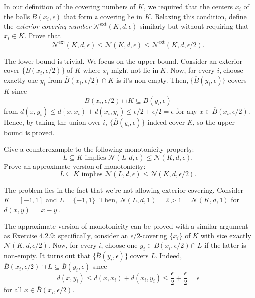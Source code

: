 \begin{problem*}[Exercise 4.2.9]\label{ex4.2.9}
	In our definition of the covering numbers of \(K\), we required that the centers \(x_i\) of the balls \(B(x_i, \epsilon )\) that form a covering lie in \(K\). Relaxing this condition, define the \emph{exterior covering number} \(\mathcal{N}^{\mathrm{ext} } (K, d, \epsilon )\) similarly but without requiring that \(x_i \in K\). Prove that
	\[
		\mathcal{N} ^{\mathrm{ext} }(K, d, \epsilon )
		\leq \mathcal{N} (K, d, \epsilon )
		\leq \mathcal{N} ^{\mathrm{ext} }(K, d, \epsilon / 2).
	\]
\end{problem*}
\begin{answer}
	The lower bound is trivial. We focus on the upper bound. Consider an exterior cover \(\{ \overline{B} (x_i, \epsilon / 2) \} \) of \(K\) where \(x_i\) might not lie in \(K\). Now, for every \(i\), choose exactly one \(y_i\) from \(\overline{B} (x_i, \epsilon / 2) \cap K\) is it's non-empty. Then, \(\{ \overline{B} (y_i, \epsilon ) \} \) covers \(K\) since
	\[
		\overline{B} (x_i, \epsilon / 2) \cap K \subseteq \overline{B} (y_i, \epsilon )
	\]
	from \(d(x, y_i) \leq d(x, x_i) + d(x_i, y_i) \leq \epsilon / 2 + \epsilon / 2 = \epsilon \) for any \(x\in \overline{B} (x_i, \epsilon / 2)\). Hence, by taking the union over \(i\), \(\{ \overline{B} (y_i, \epsilon ) \} \) indeed cover \(K\), so the upper bound is proved.
\end{answer}

\begin{problem*}[Exercise 4.2.10]\label{ex4.2.10}
	Give a counterexample to the following monotonicity property:
	\[
		L \subseteq K
		\text{ implies } \mathcal{N} (L, d, \epsilon ) \leq \mathcal{N} (K, d, \epsilon ).
	\]
	Prove an approximate version of monotonicity:
	\[
		L \subseteq K
		\text{ implies } \mathcal{N} (L, d, \epsilon ) \leq \mathcal{N} (K, d, \epsilon / 2).
	\]
\end{problem*}
\begin{answer}
	The problem lies in the fact that we're not allowing exterior covering. Consider \(K= [-1, 1]\) and \(L = \{ -1, 1 \} \). Then, \(\mathcal{N} (L, d, 1) = 2 > 1 = \mathcal{N} (K, d, 1)\) for \(d (x, y) = \lvert x - y\rvert \).

	The approximate version of monotonicity can be proved with a similar argument as \hyperref[ex4.2.9]{Exercise 4.2.9}: specifically, consider an \(\epsilon / 2\)-covering \(\{ x_i \} \) of \(K\) with size exactly \(\mathcal{N} (K, d, \epsilon / 2)\). Now, for every \(i\), choose one \(y_i \in \overline{B} (x_i, \epsilon / 2) \cap L\) if the latter is non-empty. It turns out that \(\{ \overline{B} (y_i, \epsilon ) \} \) covers \(L\). Indeed, \(\overline{B} (x_i, \epsilon / 2) \cap L \subseteq \overline{B} (y_i, \epsilon )\) since
	\[
		d(x, y_i)
		\leq d(x, x_i) + d(x_i, y_i)
		\leq \frac{\epsilon }{2} + \frac{\epsilon }{2}
		= \epsilon
	\]
	for all \(x \in \overline{B} (x_i, \epsilon / 2)\).
\end{answer}

